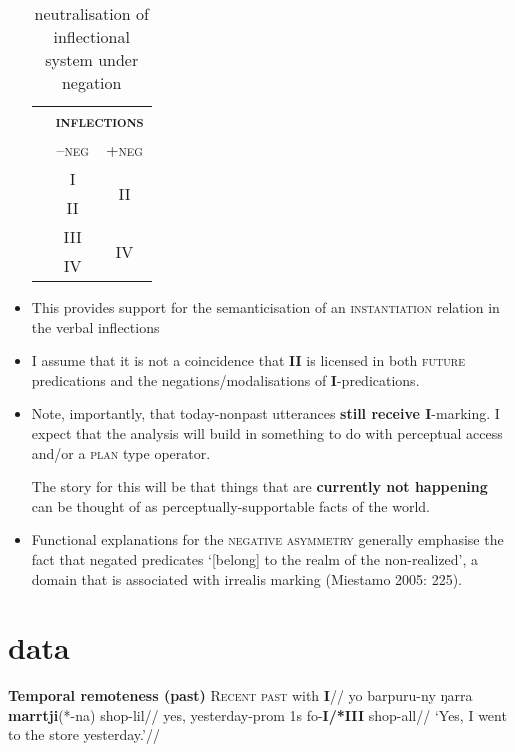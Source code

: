 \documentclass[11pt,dvipsnames]{article}
\begin{document}
\begin{itemize}
	
	\begin{table}[h]\centering
\caption{neutralisation of inflectional system under negation}\label{negneut}
	\begin{tabular}{ccc}
		&\multicolumn{2}{c}{\textsc{\textbf{inflections}}} \\
		& \textsc{--neg} & \textsc{+neg}\\\midrule
		&	\gls{I} & \multirow{2}{*}{\gls{II}}\\
		& \gls{II} \\\midrule
		&	\gls{III} & \multirow{2}{*}{\gls{IV}}\\
		& \gls{IV} \\\bottomrule
	\end{tabular}
	\end{table}
	
	\item This provides support for the semanticisation of an \textsc{instantiation} relation in the verbal inflections
	
	\item I assume that it is not a coincidence that \textbf{II} is licensed in both \textsc{future} predications and the negations/modalisations of \textbf{I}-predications.
	
	\item Note, importantly, that today-nonpast utterances \textbf{still receive I}-marking. I expect that the analysis will build in something to do with perceptual access and/or a \textsc{plan} type operator.
	
	The story for this will be that things that are \textbf{currently not happening} can be thought of as perceptually-supportable facts of the world. 
	
	
	\item Functional explanations for the \textsc{negative asymmetry} generally emphasise the fact that negated predicates `[belong] to the realm of the non-realized', a domain that is associated with irrealis marking (Miestamo 2005: 225). 
	
	
	
	
\end{itemize}



\newpage
\section*{data}
\small


\pex \textbf{Temporal remoteness (past)}
\a{}\begingl\glpreamble\textsc{Recent past} with \textbf{I}//
\gla yo barpuru-ny ŋarra \textbf{marrtji}(*-na) shop-lil//
\glb yes, yesterday{\sc-prom} 1s fo-\textbf{I/*III} shop-{\sc all}//
\glft`Yes, I went to the store yesterday.'//\endgl
\end{document}
